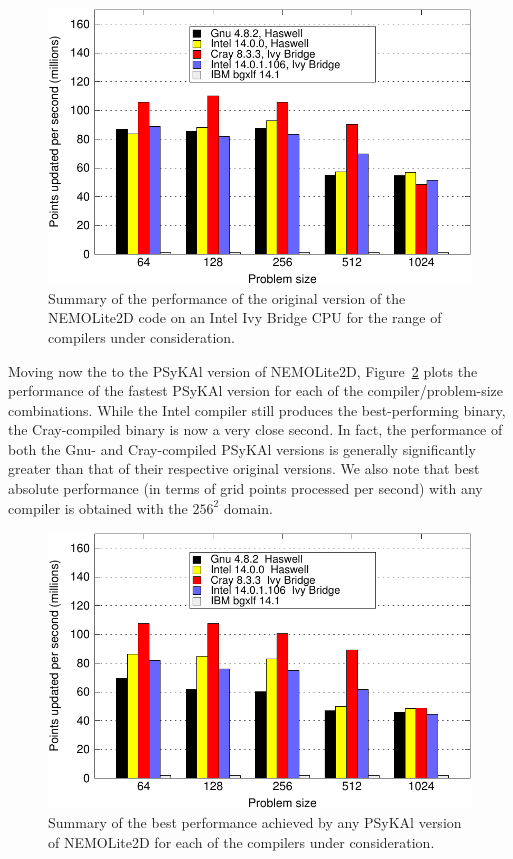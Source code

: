 \documentclass[gmdd, manuscript]{copernicus}
\newlength{\picwidth}
\begin{document}
\begin{figure}[!t]
\centering
\includegraphics[width=\picwidth]{orig_summary}
\caption{Summary of the performance of the original version of the 
NEMOLite2D code on an Intel Ivy Bridge CPU for
the range of compilers under consideration.}
\label{FIG_orig_perf_summary}
\end{figure}

Moving now the to the {PS}y{KA}l version of NEMOLite2D,
Figure~\ref{FIG_best_psykal_perf_summary} plots the performance of the
fastest {PS}y{KA}l version for each of the compiler/problem-size combinations.
While the Intel compiler still produces the best-performing binary,
the Cray-compiled binary is now a very close second. In fact, the
performance of both the Gnu- and Cray-compiled {PS}y{KA}l versions is
generally significantly greater than that of their respective original
versions. We also note that best absolute performance (in terms of
grid points processed per second) with any compiler is obtained with
the $256^2$ domain.

\begin{figure}[!t]
\centering
\includegraphics[width=\picwidth]{best_psykal_summary}
\caption{Summary of the best performance achieved by any {PS}y{KA}l 
version of NEMOLite2D for each of the compilers under consideration.}
\label{FIG_best_psykal_perf_summary}
\end{figure}
\end{document}
